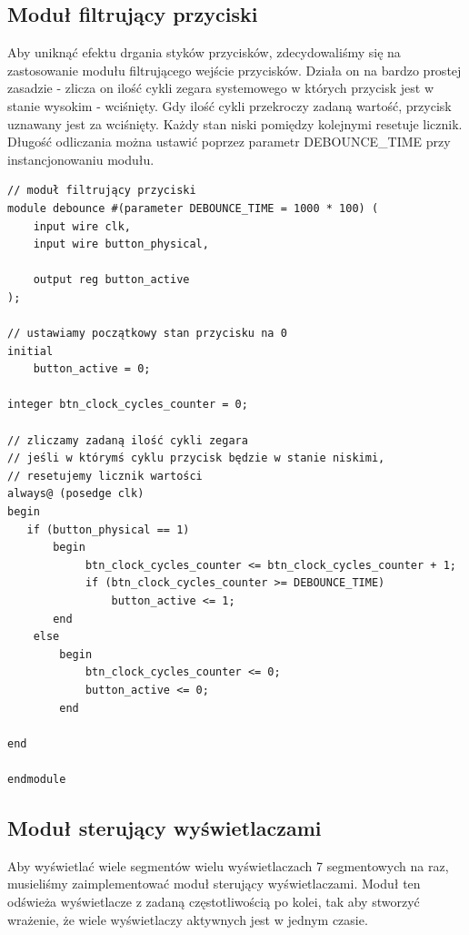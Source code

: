 \documentclass[a4paper]{article}
\begin{document}
\subsection{Moduł filtrujący przyciski}
Aby uniknąć efektu drgania styków przycisków, zdecydowaliśmy się na zastosowanie modułu
filtrującego wejście przycisków. Działa on na bardzo prostej zasadzie - zlicza on ilość 
cykli zegara systemowego w których przycisk jest w stanie wysokim - wciśnięty. Gdy ilość
cykli przekroczy zadaną wartość, przycisk uznawany jest za wciśnięty. Każdy stan niski 
pomiędzy kolejnymi resetuje licznik. Długość odliczania można ustawić poprzez
parametr DEBOUNCE\_TIME przy instancjonowaniu modułu.
\begin{verbatim}
// moduł filtrujący przyciski
module debounce #(parameter DEBOUNCE_TIME = 1000 * 100) (
    input wire clk,
    input wire button_physical,
    
    output reg button_active
);

// ustawiamy początkowy stan przycisku na 0
initial
    button_active = 0;

integer btn_clock_cycles_counter = 0;

// zliczamy zadaną ilość cykli zegara 
// jeśli w którymś cyklu przycisk będzie w stanie niskimi,
// resetujemy licznik wartości
always@ (posedge clk)
begin
   if (button_physical == 1)
       begin
            btn_clock_cycles_counter <= btn_clock_cycles_counter + 1;
            if (btn_clock_cycles_counter >= DEBOUNCE_TIME) 
                button_active <= 1;
       end
    else 
        begin
            btn_clock_cycles_counter <= 0;
            button_active <= 0;
        end
        
end

endmodule
\end{verbatim}
\subsection{Moduł sterujący wyświetlaczami}
Aby wyświetlać wiele segmentów wielu wyświetlaczach 7 segmentowych na raz,
musieliśmy zaimplementować moduł sterujący wyświetlaczami. Moduł ten 
odświeża wyświetlacze z zadaną częstotliwością po kolei, tak aby 
stworzyć wrażenie, że wiele wyświetlaczy aktywnych jest w jednym czasie.
\end{document}

